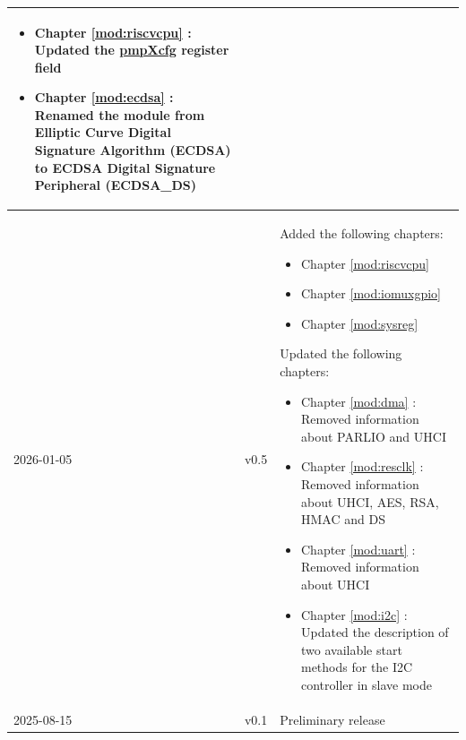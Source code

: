 \begin{longtable}[l]{ | m{2cm} | m{1.5cm} | m{12cm} | }
    \begin{itemize}
        \item Chapter \ref{mod:riscvcpu} \textit{\nameref{mod:riscvcpu}}: Updated the \hyperref[regdesc:pmpXcfg]{pmpXcfg} register field
        \item Chapter \ref{mod:ecdsa} \textit{\nameref{mod:ecdsa}}: Renamed the module from Elliptic Curve Digital Signature Algorithm (ECDSA) to ECDSA Digital Signature Peripheral (ECDSA\_DS)
    \end{itemize}
    \\\hline
    2026-01-05 & v0.5 &
    Added the following chapters:
    \begin{itemize}
        \item Chapter \ref{mod:riscvcpu} \textit{\nameref{mod:riscvcpu}}
        \item Chapter \ref{mod:iomuxgpio} \textit{\nameref{mod:iomuxgpio}}
        \item Chapter \ref{mod:sysreg} \textit{\nameref{mod:sysreg}}
    \end{itemize}
    Updated the following chapters:
    \begin{itemize}
        \item Chapter \ref{mod:dma} \textit{\nameref{mod:dma}}: Removed information about PARLIO and UHCI
        \item Chapter \ref{mod:resclk} \textit{\nameref{mod:resclk}}: Removed information about UHCI, AES, RSA, HMAC and DS
        \item Chapter \ref{mod:uart} \textit{\nameref{mod:uart}}: Removed information about UHCI %
        \item Chapter \ref{mod:i2c} \textit{\nameref{mod:i2c}}: Updated the description of two available start methods for the I2C controller in slave mode %
    \end{itemize}
    \\\hline
    2025-08-15 & v0.1 & Preliminary release \\\hline
\end{longtable}
